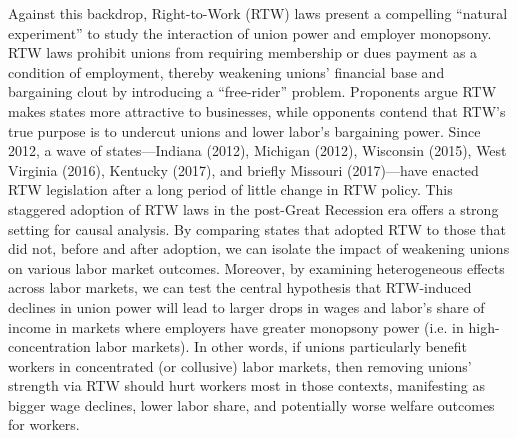 Against this backdrop, Right-to-Work (RTW) laws present a compelling “natural experiment” to study the interaction of union power and employer monopsony.
RTW laws prohibit unions from requiring membership or dues payment as a condition of employment, thereby weakening unions’ financial base and bargaining clout by introducing a “free-rider” problem.
Proponents argue RTW makes states more attractive to businesses, while opponents contend that RTW’s true purpose is to undercut unions and lower labor’s bargaining power.
Since 2012, a wave of states—Indiana (2012), Michigan (2012), Wisconsin (2015), West Virginia (2016), Kentucky (2017), and briefly Missouri (2017)—have enacted RTW legislation after a long period of little change in RTW policy.
This staggered adoption of RTW laws in the post-Great Recession era offers a strong setting for causal analysis.
By comparing states that adopted RTW to those that did not, before and after adoption, we can isolate the impact of weakening unions on various labor market outcomes.
Moreover, by examining heterogeneous effects across labor markets, we can test the central hypothesis that RTW-induced declines in union power will lead to larger drops in wages and labor’s share of income in markets where employers have greater monopsony power (i.e. in high-concentration labor markets).
In other words, if unions particularly benefit workers in concentrated (or collusive) labor markets, then removing unions’ strength via RTW should hurt workers most in those contexts, manifesting as bigger wage declines, lower labor share, and potentially worse welfare outcomes for workers.

